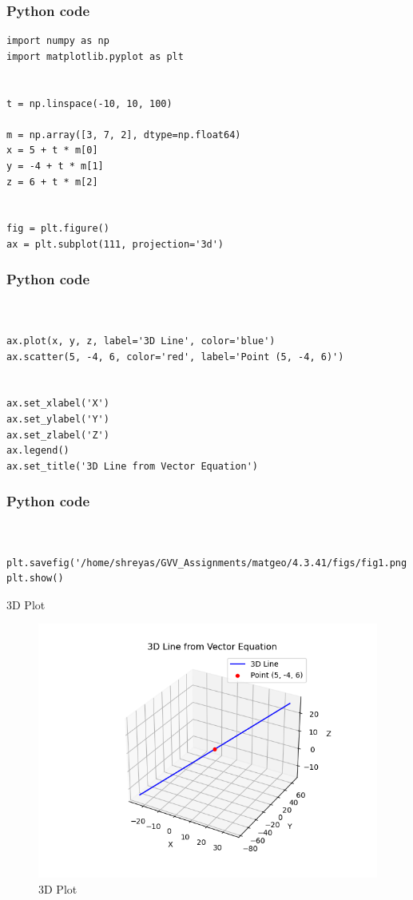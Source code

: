 \documentclass{beamer}
\begin{document}
\begin{frame}[fragile]
\frametitle{Python code}
\begin{lstlisting}
import numpy as np
import matplotlib.pyplot as plt


t = np.linspace(-10, 10, 100)

m = np.array([3, 7, 2], dtype=np.float64)
x = 5 + t * m[0]
y = -4 + t * m[1]
z = 6 + t * m[2]


fig = plt.figure()
ax = plt.subplot(111, projection='3d')  

\end{lstlisting}
\end{frame}

\begin{frame}[fragile]
\frametitle{Python code}
\begin{lstlisting}


ax.plot(x, y, z, label='3D Line', color='blue')
ax.scatter(5, -4, 6, color='red', label='Point (5, -4, 6)')


ax.set_xlabel('X')
ax.set_ylabel('Y')
ax.set_zlabel('Z')
ax.legend()
ax.set_title('3D Line from Vector Equation')

\end{lstlisting}
\end{frame}

\begin{frame}[fragile]
\frametitle{Python code}
\begin{lstlisting}


plt.savefig('/home/shreyas/GVV_Assignments/matgeo/4.3.41/figs/fig1.png')
plt.show()

\end{lstlisting}
\end{frame}

\begin{frame}{3D Plot}
\begin{figure}[H]
    \centering
    \includegraphics[width=0.8\columnwidth]{figs/fig1.png}
    \caption{3D Plot}
    \label{3D Plot}
\end{figure}
\end{frame}
\end{document}
